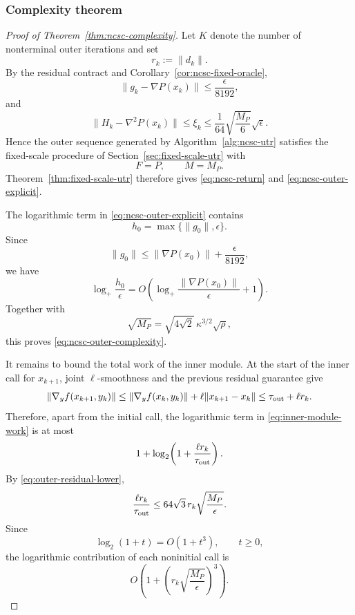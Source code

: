 \subsubsection*{Complexity theorem}

\begin{proof}[Proof of Theorem~\ref{thm:ncsc-complexity}]
Let $K$ denote the number of nonterminal outer iterations and set
\[
    r_k:=\|d_k\|.
\]
By the residual contract and
Corollary~\ref{cor:ncsc-fixed-oracle},
\[
    \|g_k-\nabla P(x_k)\|
    \le
    \frac{\epsilon}{8192},
\]
and
\[
    \|H_k-\nabla^2P(x_k)\|
    \le
    \xi_k
    \le
    \frac1{64}
    \sqrt{\frac{M_P}{6}}\sqrt\epsilon.
\]
Hence the outer sequence generated by
Algorithm~\ref{alg:ncsc-utr} satisfies the fixed-scale procedure of
Section~\ref{sec:fixed-scale-utr} with
\[
    F=P,
    \qquad
    M=M_P.
\]
Theorem~\ref{thm:fixed-scale-utr} therefore gives
\eqref{eq:ncsc-return} and
\eqref{eq:ncsc-outer-explicit}.

The logarithmic term in
\eqref{eq:ncsc-outer-explicit} contains
\[
    h_0
    =
    \max\{\|g_0\|,\epsilon\}.
\]
Since
\[
    \|g_0\|
    \le
    \|\nabla P(x_0)\|
    +
    \frac{\epsilon}{8192},
\]
we have
\[
    \log_+\frac{h_0}{\epsilon}
    =
    O\!\left(
        \log_+
        \frac{\|\nabla P(x_0)\|}{\epsilon}
        +1
    \right).
\]
Together with
\[
    \sqrt{M_P}
    =
    \sqrt{4\sqrt2}\,
    \kappa^{3/2}\sqrt\rho,
\]
this proves
\eqref{eq:ncsc-outer-complexity}.

It remains to bound the total work of the inner module.
At the start of the inner call for $x_{k+1}$, joint
$\ell$-smoothness and the previous residual guarantee give
\[
    \|\nabla_yf(x_{k+1},y_k)\|
    \le
    \|\nabla_yf(x_k,y_k)\|
    +
    \ell\|x_{k+1}-x_k\|
    \le
    \tau_{\rm out}+\ell r_k.
\]
Therefore, apart from the initial call, the logarithmic term in
\eqref{eq:inner-module-work} is at most
\[
    1+
    \log_2\!\left(
        1+\frac{\ell r_k}{\tau_{\rm out}}
    \right).
\]
By \eqref{eq:outer-residual-lower},
\[
    \frac{\ell r_k}{\tau_{\rm out}}
    \le
    64\sqrt3\,
    r_k
    \sqrt{\frac{M_P}{\epsilon}}.
\]
Since
\[
    \log_2(1+t)
    =
    O(1+t^3),
    \qquad t\ge0,
\]
the logarithmic contribution of each noninitial call is
\[
    O\!\left(
        1+
        \left(
            r_k\sqrt{\frac{M_P}{\epsilon}}
        \right)^3
    \right).
\]


\end{proof}
